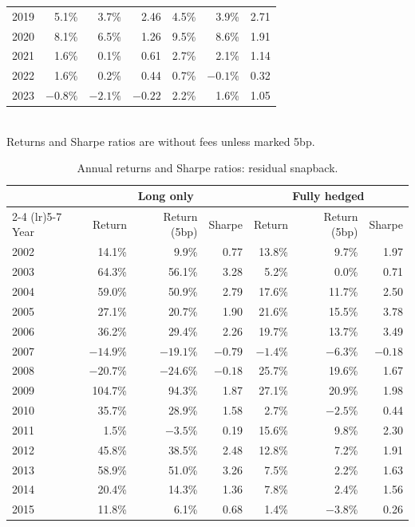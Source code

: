 \documentclass[12pt,letterpaper]{article}
\begin{document}
\begin{table}[H]
\begin{tabular}{lrrrrrr}
2019 & 5.1\% & 3.7\% & 2.46 & 4.5\% & 3.9\% & 2.71 \\
2020 & 8.1\% & 6.5\% & 1.26 & 9.5\% & 8.6\% & 1.91 \\
2021 & 1.6\% & 0.1\% & 0.61 & 2.7\% & 2.1\% & 1.14 \\
2022 & 1.6\% & 0.2\% & 0.44 & 0.7\% & $-0.1\%$ & 0.32 \\
2023 & $-0.8\%$ & $-2.1\%$ & $-0.22$ & 2.2\% & 1.6\% & 1.05 \\
\bottomrule
\end{tabular}
\\[4pt]
\small Returns and Sharpe ratios are without fees unless marked 5bp.
\end{table}

\begin{table}[H]
\centering
\caption{Annual returns and Sharpe ratios: residual snapback.}
\label{tab:yearly-snap}
\begin{tabular}{lrrrrrr}
\toprule
& \multicolumn{3}{c}{Long only} & \multicolumn{3}{c}{Fully hedged} \\
\cmidrule(lr){2-4} \cmidrule(lr){5-7}
Year & Return & Return (5bp) & Sharpe & Return & Return (5bp) & Sharpe \\
\midrule
2002 & 14.1\% & 9.9\% & 0.77 & 13.8\% & 9.7\% & 1.97 \\
2003 & 64.3\% & 56.1\% & 3.28 & 5.2\% & 0.0\% & 0.71 \\
2004 & 59.0\% & 50.9\% & 2.79 & 17.6\% & 11.7\% & 2.50 \\
2005 & 27.1\% & 20.7\% & 1.90 & 21.6\% & 15.5\% & 3.78 \\
2006 & 36.2\% & 29.4\% & 2.26 & 19.7\% & 13.7\% & 3.49 \\
2007 & $-14.9\%$ & $-19.1\%$ & $-0.79$ & $-1.4\%$ & $-6.3\%$ & $-0.18$ \\
2008 & $-20.7\%$ & $-24.6\%$ & $-0.18$ & 25.7\% & 19.6\% & 1.67 \\
2009 & 104.7\% & 94.3\% & 1.87 & 27.1\% & 20.9\% & 1.98 \\
2010 & 35.7\% & 28.9\% & 1.58 & 2.7\% & $-2.5\%$ & 0.44 \\
2011 & 1.5\% & $-3.5\%$ & 0.19 & 15.6\% & 9.8\% & 2.30 \\
2012 & 45.8\% & 38.5\% & 2.48 & 12.8\% & 7.2\% & 1.91 \\
2013 & 58.9\% & 51.0\% & 3.26 & 7.5\% & 2.2\% & 1.63 \\
2014 & 20.4\% & 14.3\% & 1.36 & 7.8\% & 2.4\% & 1.56 \\
2015 & 11.8\% & 6.1\% & 0.68 & 1.4\% & $-3.8\%$ & 0.26 \\

\end{tabular}
\end{table}
\end{document}
